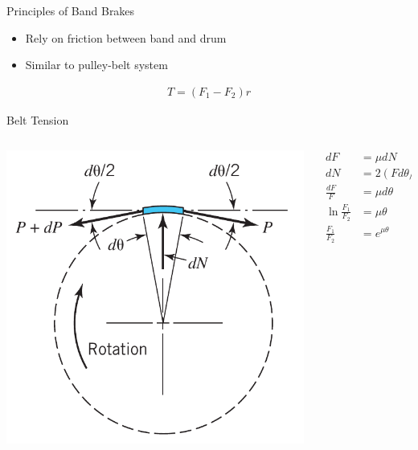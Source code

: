 \documentclass[10pt, svgnames]{beamer}
\begin{document}
\begin{frame}[label={sec:org2a2d872}]{Principles of Band Brakes}
\begin{itemize}
\item Rely on friction between band and drum
\item Similar to pulley-belt system
\end{itemize}

\begin{align*}
    T = (F_1 - F_2)r
\end{align*}
\end{frame}

\begin{frame}[label={sec:org533a7b4}]{Belt Tension}
\begin{columns}
\begin{column}{0.7\columnwidth}
\begin{center}
\includegraphics[height=0.8\textheight]{./pictures/band-brake.png}
\end{center}
\end{column}

\begin{column}{0.3\columnwidth}
\begin{align*}
  dF &= \mu dN \\
  dN &= 2(F d\theta/2) = Fd\theta \\
  \frac{dF}{F} &= \mu d\theta \\
  \ln \frac{F_1}{F_2} &= \mu \theta \\
  \frac{F_1}{F_2} &= e^{\mu\theta}
\end{align*}
\end{column}
\end{columns}
\end{frame}
\end{document}
